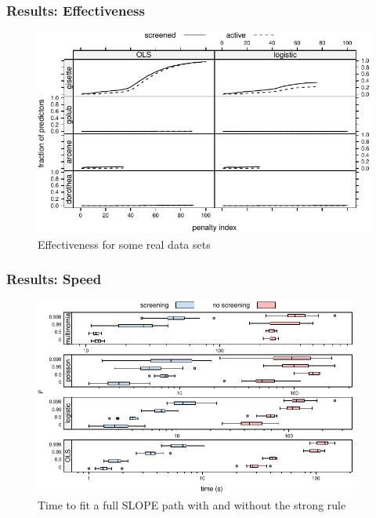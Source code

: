\documentclass[10pt]{beamer}
\begin{document}
\begin{frame}[c]
  \frametitle{Results: Effectiveness}

  \begin{figure}[htpb]
    \centering
    \includegraphics[width=\textwidth]{figures/paper1-efficiency-real.pdf}
    \caption{%
      Effectiveness for some real data sets
    }
  \end{figure}
\end{frame}

\begin{frame}[c]
  \frametitle{Results: Speed}

  \begin{figure}[htpb]
    \centering
    \includegraphics[width=0.95\textwidth]{figures/paper1-performance.pdf}
    \caption{%
      Time to fit a full SLOPE path with and without the strong rule
    }
  \end{figure}
\end{frame}
\end{document}
